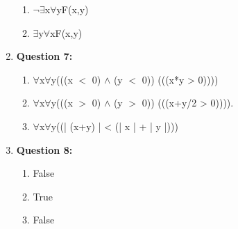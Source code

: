\documentclass[11pt]{article}
\begin{document}
\begin{enumerate}
\begin{enumerate}[label=(\alph*)]
\item{$\neg$$\exists$x$\forall$yF(x,y)}

\item{$\exists$y$\forall$xF(x,y)}

\end{enumerate}

\item
\textbf{Question 7:}
\begin{enumerate}[label=(\alph*)]

\item{$\forall$x$\forall$y(((x $<$ 0) $\wedge$ (y $<$ 0)) \rightarrow (((x*y > 0)))) }

\item{$\forall$x$\forall$y(((x $>$ 0) $\wedge$ (y $>$ 0)) \rightarrow (((x+y/2 > 0)))).}

\item{$\forall$x$\forall$y((\left| (x+y) \right| < (\left| x \right| + \left| y \right|)))}

\end{enumerate}

\item
\textbf{Question 8:}
\begin{enumerate}[label=(\alph*)]

\item{False}

\item{True}

\item{False}


\end{enumerate}

\end{enumerate}
\end{document}
